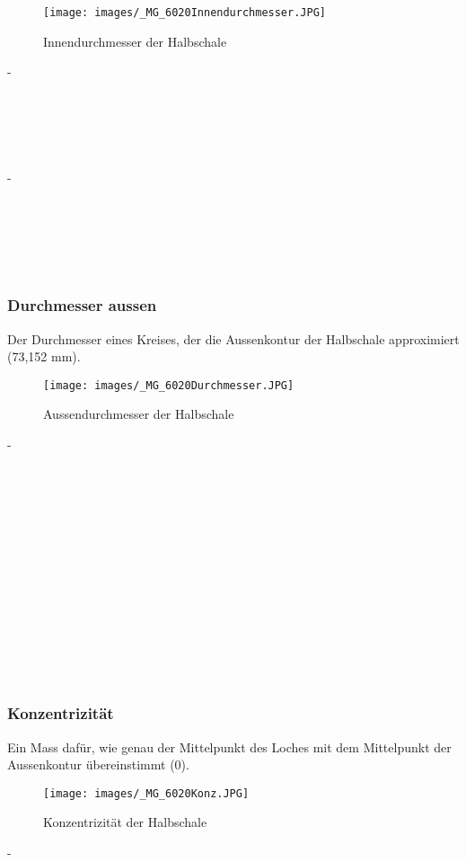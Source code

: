 \begin{wrapfigure}{r}{0.3\textwidth}
\centering
\texttt{[image: images/\_MG\_6020Innendurchmesser.JPG]}
\caption{Innendurchmesser der Halbschale}
\label{fig:DefI}
\end{wrapfigure}
-\\
\\
\\
\\
\\
\\

-\\
\\
\\
\\
\\
\\
\subsubsection*{Durchmesser aussen}

Der Durchmesser eines Kreises, der die Aussenkontur der Halbschale approximiert (73,152 mm).

\begin{wrapfigure}{r}{0.3\textwidth}
\centering
\texttt{[image: images/\_MG\_6020Durchmesser.JPG]}
\caption{Aussendurchmesser der Halbschale}
\label{fig:DefA}
\end{wrapfigure}
-\\
\\
\\
\\
\\
\\
\\
\\
\\
\\
\\
\\
\\
\\
\subsubsection*{Konzentrizität}
Ein Mass dafür, wie genau der Mittelpunkt des Loches mit dem Mittelpunkt der Aussenkontur übereinstimmt (0).

\begin{wrapfigure}{r}{0.3\textwidth}
\centering
\texttt{[image: images/\_MG\_6020Konz.JPG]}
\caption{Konzentrizität der Halbschale}
\label{fig:DefK}
\end{wrapfigure}
-\\
\\
\\
\\
\\
\\
\\
\\
\\
\\
\\
\\
